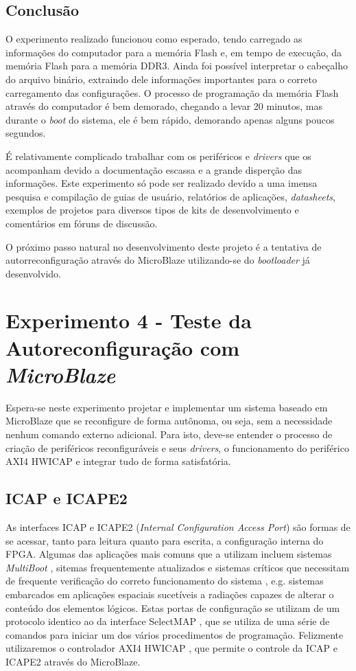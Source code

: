 \documentclass[11pt,a4paper,oneside]{book}
\begin{document}
\section{Conclusão}
O experimento realizado funcionou como esperado, tendo carregado as informações do computador para a memória Flash e, em tempo de execução, da memória Flash para a memória DDR3.
Ainda foi possível interpretar o cabeçalho do arquivo binário, extraindo dele informações importantes para o correto carregamento das configurações.
O processo de programação da memória Flash através do computador é bem demorado, chegando a levar 20 minutos, mas durante o \textit{boot} do sistema, ele é bem rápido, demorando apenas alguns poucos segundos.

É relativamente complicado trabalhar com os periféricos e \textit{drivers} que os acompanham devido a documentação escassa e a grande disperção das informações.
Este experimento só pode ser realizado devido a uma imensa pesquisa e compilação de guias de usuário, relatórios de aplicações, \textit{datasheets}, exemplos de projetos para diversos tipos de kits de desenvolvimento e comentários em fóruns de discussão.

O próximo passo natural no desenvolvimento deste projeto é a tentativa de autorreconfiguração através do MicroBlaze utilizando-se do \textit{bootloader} já desenvolvido.

\chapter{Experimento 4 - Teste da Autoreconfiguração com \textit{MicroBlaze}}
Espera-se neste experimento projetar e implementar um sistema baseado em MicroBlaze que se reconfigure de forma autônoma, ou seja, sem a necessidade nenhum comando externo adicional.
Para isto, deve-se entender o processo de criação de periféricos reconfiguráveis e seus \textit{drivers}, o funcionamento do periférico AXI4 HWICAP e integrar tudo de forma satisfatória.

\section{ICAP e ICAPE2}
As interfaces ICAP e ICAPE2 (\textit{Internal Configuration Access Port}) são formas de se acessar, tanto para leitura quanto para escrita, a configuração interna do FPGA.
Algumas das aplicações mais comuns que a utilizam incluem sistemas \textit{MultiBoot} \cite{xapp468, xapp1100}, sitemas frequentemente atualizados e sistemas críticos que necessitam de frequente verificação do correto funcionamento do sistema \cite{xapp468, xapp887}, e.g. sistemas embarcados em aplicações espaciais sucetíveis a radiações capazes de alterar o conteúdo dos elementos lógicos. 
Estas portas de configuração se utilizam de um protocolo identico ao da interface SelectMAP \cite{wp374, ug702}, que se utiliza de uma série de comandos para iniciar um dos vários procedimentos de programação.
Felizmente utilizaremos o controlador AXI4 HWICAP \cite{ds817}, que permite o controle da ICAP e ICAPE2 através do MicroBlaze.
\end{document}
